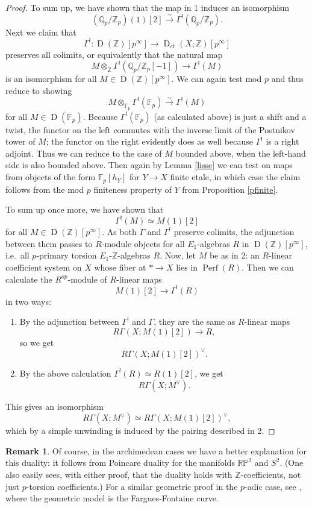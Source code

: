 \documentclass[12pt]{article}
\theoremstyle{definition}
\newtheorem{remark}[theorem]{Remark}
\newcommand{\on}{\operatorname}
\newcommand{\mbb}{\mathbb}
\begin{document}
\begin{proof}
To sum up, we have shown that the map in 1 induces an isomorphism
$$(\mbb{Q}_p/\mbb{Z}_p)(1)[2] \overset{\sim}{\rightarrow} \Gamma^!(\mbb{Q}_p/\mbb{Z}_p).$$
Next we claim that\
$$\Gamma^!:\on{D}(\mbb{Z})[p^\infty] \to \on{D}_{et}(X;\mbb{Z})[p^\infty]$$
preserves all colimits, or equivalently that the natural map
$$M\otimes_\mbb{Z} \Gamma^!(\mbb{Q}_p/\mbb{Z}_p[-1]) \to \Gamma^!(M)$$
is an isomorphism for all $M\in\on{D}(\mbb{Z})[p^\infty]$.  We can again test mod $p$ and thus reduce to showing
$$M\otimes_{\mbb{F}_p} \Gamma^!(\mbb{F}_p)\overset{\sim}{\rightarrow} \Gamma^!(M)$$
for all $M\in\on{D}(\mbb{F}_p)$.  Because $\Gamma^!(\mbb{F}_p)$ (as calculated above) is just a shift and a twist, the functor on the left commutes with the inverse limit of the Postnikov tower of $M$; the functor on the right evidently does as well because $\Gamma^!$ is a right adjoint.  Thus we can reduce to the case of $M$ bounded above, when the left-hand side is also bounded above.  Then again by Lemma \ref{lisse} we can test on maps from objects of the form $\mbb{F}_p[h_Y]$ for $Y\to X$ finite etale, in which case the claim follows from the mod $p$ finiteness property of $Y$ from Proposition \ref{pfinite}.

To sum up once more, we have shown that\
$$\Gamma^!(M) \simeq M(1)[2]$$
for all $M\in\on{D}(\mbb{Z})[p^\infty]$.  As both $\Gamma$ and $\Gamma^!$ preserve colimits, the adjunction between them passes to $R$-module objects for all $E_1$-algebras $R$ in $\on{D}(\mbb{Z})[p^\infty]$, i.e.\ all $p$-primary torsion $E_1$-$\mbb{Z}$-algebras $R$.  Now, let $M$ be as in 2: an $R$-linear coefficient system on $X$ whose fiber at $\ast \to X$ lies in $\on{Perf}(R)$.  Then we can calculate the $R^{op}$-module of $R$-linear maps
$$ M(1)[2] \to \Gamma^!(R)$$
 in two ways:
\begin{enumerate}
\item By the adjunction between $\Gamma^!$ and $\Gamma$, they are the same as $R$-linear maps
$$ R\Gamma(X;M(1)[2]) \to R,$$
so we get
$$R\Gamma(X;M(1)[2])^\vee.$$
\item By the above calculation $\Gamma^!(R)\simeq R(1)[2]$, we get
$$R\Gamma(X;M^\vee).$$
\end{enumerate}
This gives an isomorphism
$$R\Gamma(X;M^\vee)\simeq R\Gamma(X;M(1)[2])^\vee,$$
which by a simple unwinding is induced by the pairing described in 2.
\end{proof}


\begin{remark}
Of course, in the archimedean cases we have a better explanation for this duality: it follows from Poincare duality for the manifolds $\mbb{R}\mbb{P}^2$ and $S^2$.  (One also easily sees, with either proof, that the duality holds with $\mbb{Z}$-coefficients, not just $p$-torsion coefficients.)  For a similar geometric proof in the $p$-adic case, see \cite{farguescft}, where the geometric model is the Fargues-Fontaine curve.
\end{remark}
\end{document}
